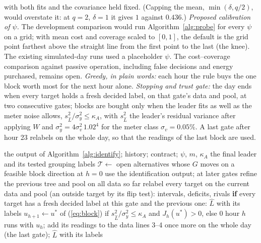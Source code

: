 \documentclass[journal,onecolumn,11pt]{IEEEtran}
\newcommand{\Tset}{\mathcal{T}}
\begin{document}
with both fits and the covariance held fixed. (Capping the mean, $\min(\delta,q/2)$, would overstate it: at $q=2$, $\delta=1$
it gives $1$ against $0.436$.) \emph{Proposed calibration of $\psi$.} The development comparison would run Algorithm~\ref{alg:probe} for every
$\psi$ on a grid; with mean cost and coverage scaled to $[0,1]$, the default is the grid point farthest above the straight
line from the first point to the last (the knee). The existing simulated-day runs used a placeholder $\psi$.
The cost--coverage comparison against passive operation, including false decisions and energy purchased, remains open.
\emph{Greedy, in plain
words:} each hour the rule buys the one block worth most for the next hour alone. \emph{Stopping and trust gate:} the day
ends when every target holds a fresh decided label, on that gate's data and pool, at two consecutive gates; blocks are
bought only when the leader fits as well as the meter noise allows, $s^2_{\hat L}/\sigma^2_y\le\kappa_A$, with $s^2_{\hat L}$ the
leader's residual variance after applying $W$ and $\sigma^2_y=4\sigma_v^2\,1.02^4$ for the meter class $\sigma_v=0.05\%$. A last gate after
hour 23 relabels on the whole day, so that the readings of the last block are used.

\begin{algorithm}[t]
\caption{\textsc{Probe}: one day of cost-aware probing (proposed)}\label{alg:probe}
\begin{algorithmic}[1]
\Require the output of Algorithm~\ref{alg:identify}; history; contract; $\psi$, $m$, $\kappa_A$
\Ensure the final leader and its tested grouping labels
\State $\Tset\gets$ open alternatives whose $G$ moves on a feasible block direction 
 
  \State at $h=0$ use the identification output; at later gates refine the previous tree and pool on all data so far
  \State relabel every target on the current data and pool (an outside target by its flip test): intervals, deficits, rivals
  \State \textbf{if} every target has a fresh decided label at this gate and the previous one: \Return $\hat L$ with its labels
  \State $u_{h+1}\gets u^\ast$ of (\ref{eq:block}) if $s^2_{\hat L}/\sigma^2_y\le\kappa_A$ and $J_h(u^\ast)>0$, else $0$
  \State hour $h$ runs with $u_h$; add its readings to the data
\EndFor
\State lines 3--4 once more on the whole day (the last gate); \Return $\hat L$ with its labels 
\end{algorithmic}
\end{algorithm}
\end{document}
